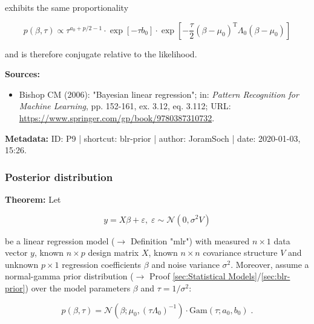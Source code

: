 \documentclass[a4paper,12pt]{book}
\begin{document}
exhibits the same proportionality

\begin{equation} \label{eq:blr-prior-BLR-prior-s3}
p(\beta,\tau) \propto \tau^{a_0+p/2-1} \cdot \exp[-\tau b_0] \cdot \exp\left[ -\frac{\tau}{2} (\beta-\mu_0)^\mathrm{T} \Lambda_0 (\beta-\mu_0) \right]
\end{equation}

and is therefore conjugate relative to the likelihood.

\vspace{1em}
\textbf{Sources:}
\begin{itemize}
\item Bishop CM (2006): "Bayesian linear regression"; in: \textit{Pattern Recognition for Machine Learning}, pp. 152-161, ex. 3.12, eq. 3.112; URL: \url{https://www.springer.com/gp/book/9780387310732}.
\end{itemize}


\vspace{1em}
\textbf{Metadata:} ID: P9 | shortcut: blr-prior | author: JoramSoch | date: 2020-01-03, 15:26.


\subsubsection[\textbf{Posterior distribution}]{Posterior distribution} \label{sec:blr-post}

\vspace{1em}
\textbf{Theorem:} Let

\begin{equation} \label{eq:blr-post-GLM}
y = X \beta + \varepsilon, \; \varepsilon \sim \mathcal{N}(0, \sigma^2 V)
\end{equation}

be a linear regression model ($\rightarrow$ Definition "mlr") with measured $n \times 1$ data vector $y$, known $n \times p$ design matrix $X$, known $n \times n$ covariance structure $V$ and unknown $p \times 1$ regression coefficients $\beta$ and noise variance $\sigma^2$.  Moreover, assume a normal-gamma prior distribution ($\rightarrow$ Proof \ref{sec:Statistical Models}/\ref{sec:blr-prior}) over the model parameters $\beta$ and $\tau = 1/\sigma^2$:

\begin{equation} \label{eq:blr-post-GLM-NG-prior}
p(\beta,\tau) = \mathcal{N}(\beta; \mu_0, (\tau \Lambda_0)^{-1}) \cdot \mathrm{Gam}(\tau; a_0, b_0) \; .
\end{equation}
\end{document}
